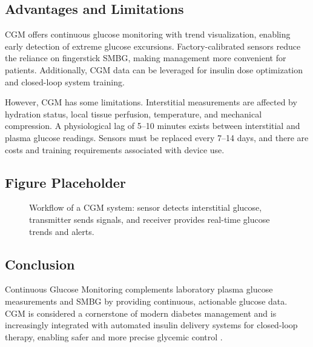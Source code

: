 \documentclass[12pt,a4paper]{article}  %
\begin{document}
\subsection{Advantages and Limitations}
CGM offers continuous glucose monitoring with trend visualization, enabling early detection of extreme glucose excursions. Factory-calibrated sensors reduce the reliance on fingerstick SMBG, making management more convenient for patients. Additionally, CGM data can be leveraged for insulin dose optimization and closed-loop system training.  

However, CGM has some limitations. Interstitial measurements are affected by hydration status, local tissue perfusion, temperature, and mechanical compression. A physiological lag of 5--10 minutes exists between interstitial and plasma glucose readings. Sensors must be replaced every 7--14 days, and there are costs and training requirements associated with device use.

\subsection{Figure Placeholder}
\begin{figure}[h!]
\centering
{}
\caption{Workflow of a CGM system: sensor detects interstitial glucose, transmitter sends signals, and receiver provides real-time glucose trends and alerts.}
\label{fig:cgm_workflow}
\end{figure}

\subsection{Conclusion}
Continuous Glucose Monitoring complements laboratory plasma glucose measurements and SMBG by providing continuous, actionable glucose data. CGM is considered a cornerstone of modern diabetes management and is increasingly integrated with automated insulin delivery systems for closed-loop therapy, enabling safer and more precise glycemic control \cite{CGM_Ambulatory_Review_2024}.



\end{document}
